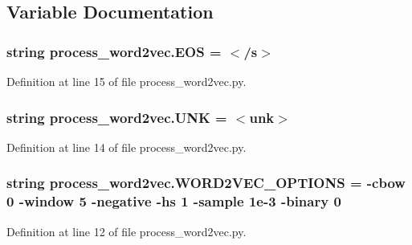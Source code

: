 \subsection{Variable Documentation}
\subsubsection[{\texorpdfstring{E\+OS}{EOS}}]{\setlength{\rightskip}{0pt plus 5cm}string process\+\_\+word2vec.\+E\+OS = \textquotesingle{}$<$/s$>$\textquotesingle{}}\hypertarget{namespaceprocess__word2vec_a3bd8d79e8af7445e67a587bdbdb78778}{}\label{namespaceprocess__word2vec_a3bd8d79e8af7445e67a587bdbdb78778}


Definition at line 15 of file process\+\_\+word2vec.\+py.

\subsubsection[{\texorpdfstring{U\+NK}{UNK}}]{\setlength{\rightskip}{0pt plus 5cm}string process\+\_\+word2vec.\+U\+NK = \textquotesingle{}$<$unk$>$\textquotesingle{}}\hypertarget{namespaceprocess__word2vec_a416fec5596d37bdd6ace89870779feec}{}\label{namespaceprocess__word2vec_a416fec5596d37bdd6ace89870779feec}


Definition at line 14 of file process\+\_\+word2vec.\+py.

\subsubsection[{\texorpdfstring{W\+O\+R\+D2\+V\+E\+C\+\_\+\+O\+P\+T\+I\+O\+NS}{WORD2VEC_OPTIONS}}]{\setlength{\rightskip}{0pt plus 5cm}string process\+\_\+word2vec.\+W\+O\+R\+D2\+V\+E\+C\+\_\+\+O\+P\+T\+I\+O\+NS = \textquotesingle{}-\/cbow 0 -\/window 5 -\/negative -\/hs 1 -\/sample 1e-\/3 -\/binary 0\textquotesingle{}}\hypertarget{namespaceprocess__word2vec_a56790e0ff66512140343a1430a181340}{}\label{namespaceprocess__word2vec_a56790e0ff66512140343a1430a181340}


Definition at line 12 of file process\+\_\+word2vec.\+py.

